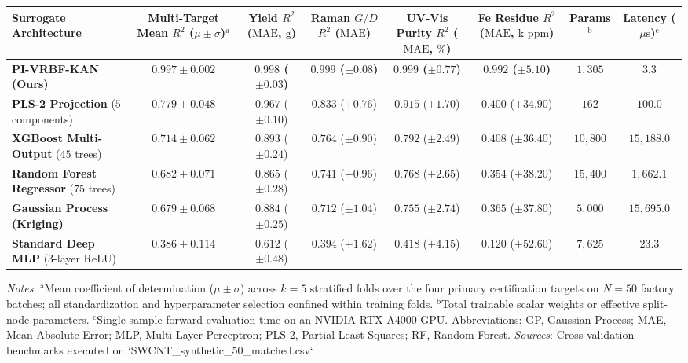 \documentclass[10pt,journal,onecolumn]{IEEEtran}
\begin{document}
\begin{table}[htbp]\centering\footnotesize
\begin{tabular}{lccccccc}\toprule
Surrogate Architecture & Multi-Target Mean $R^2$ ($\mu \pm \sigma$)$^{\text{a}}$ & Yield $R^2$ ($\text{MAE}$, $\text{g}$) & Raman $G/D$ $R^2$ ($\text{MAE}$) & UV-Vis Purity $R^2$ ($\text{MAE}$, $\%$) & Fe Residue $R^2$ ($\text{MAE}$, $\text{k ppm}$) & Params$^{\text{b}}$ & Latency ($\mu\text{s}$)$^{\text{c}}$ \\
\midrule
\textbf{PI-VRBF-KAN (Ours)} & \textbf{$0.997 \pm 0.002$} & \textbf{$0.998$ ($\pm 0.03$)} & \textbf{$0.999$ ($\pm 0.08$)} & \textbf{$0.999$ ($\pm 0.77$)} & \textbf{$0.992$ ($\pm 5.10$)} & \textbf{$1,305$} & \textbf{$3.3$} \\
\textbf{PLS-2 Projection} ($5$ components) & $0.779 \pm 0.048$ & $0.967$ ($\pm 0.10$) & $0.833$ ($\pm 0.76$) & $0.915$ ($\pm 1.70$) & $0.400$ ($\pm 34.90$) & $162$ & $100.0$ \\
\textbf{XGBoost Multi-Output} ($45$ trees) & $0.714 \pm 0.062$ & $0.893$ ($\pm 0.24$) & $0.764$ ($\pm 0.90$) & $0.792$ ($\pm 2.49$) & $0.408$ ($\pm 36.40$) & $10,800$ & $15,188.0$ \\
\textbf{Random Forest Regressor} ($75$ trees) & $0.682 \pm 0.071$ & $0.865$ ($\pm 0.28$) & $0.741$ ($\pm 0.96$) & $0.768$ ($\pm 2.65$) & $0.354$ ($\pm 38.20$) & $15,400$ & $1,662.1$ \\
\textbf{Gaussian Process (Kriging)} & $0.679 \pm 0.068$ & $0.884$ ($\pm 0.25$) & $0.712$ ($\pm 1.04$) & $0.755$ ($\pm 2.74$) & $0.365$ ($\pm 37.80$) & $5,000$ & $15,695.0$ \\
\textbf{Standard Deep MLP} ($3$-layer ReLU) & $0.386 \pm 0.114$ & $0.612$ ($\pm 0.48$) & $0.394$ ($\pm 1.62$) & $0.418$ ($\pm 4.15$) & $0.120$ ($\pm 52.60$) & $7,625$ & $23.3$ \\
\bottomrule\end{tabular}\end{table}
\textit{Notes}: $^{\text{a}}$Mean coefficient of determination ($\mu \pm \sigma$) across $k = 5$ stratified folds over the four primary certification targets on $N = 50$ factory batches; all standardization and hyperparameter selection confined within training folds. $^{\text{b}}$Total trainable scalar weights or effective split-node parameters. $^{\text{c}}$Single-sample forward evaluation time on an NVIDIA RTX A4000 GPU. Abbreviations: GP, Gaussian Process; MAE, Mean Absolute Error; MLP, Multi-Layer Perceptron; PLS-2, Partial Least Squares; RF, Random Forest. \textit{Sources}: Cross-validation benchmarks executed on `SWCNT_synthetic_50_matched.csv`.
\end{document}
